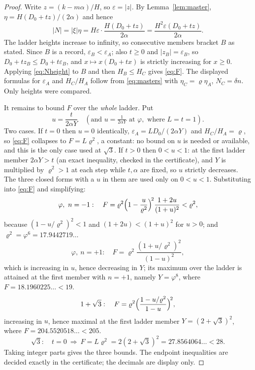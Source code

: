 \documentclass[11pt]{article}
\theoremstyle{definition}
\theoremstyle{remark}
\newcommand{\pr}{\varrho}
\begin{document}
\begin{proof}
Write $z=(k-m\alpha)/H$, so $\varepsilon=|z|$. By Lemma~\ref{lem:master},
$\eta=H(D_0+tz)/(2\alpha)$ and hence
\begin{equation}\label{eq:Nheight}
|N|=|\xi|\eta=H\varepsilon\cdot\frac{H(D_0+tz)}{2\alpha}=\frac{H^2\varepsilon(D_0+tz)}{2\alpha}.
\end{equation}
The ladder heights increase to infinity, so consecutive members bracket $B$ as stated. Since
$B$ is a record, $\varepsilon_B<\varepsilon_A$; also $t\ge0$ and $|z_B|=\varepsilon_B$, so
$D_0+tz_B\le D_0+t\varepsilon_B$, and $x\mapsto x(D_0+tx)$ is strictly increasing for $x\ge0$.
Applying \eqref{eq:Nheight} to $B$ and then $H_B\le H_C$ gives \eqref{eq:F}. The displayed
formulas for $\varepsilon_A$ and $H_C/H_A$ follow from \eqref{eq:masters} with $\eta_C=\pr\eta_A$,
$N_C=\delta n$. Only heights were compared.

It remains to bound $F$ over the \emph{whole} ladder. Put
\[
u=\frac{t}{2\alpha Y}\quad(\text{and }u=\tfrac1{2\alpha Y}\text{ at }\varphi,\text{ where }L=t=1).
\]
Two cases. If $t=0$ then $u=0$ identically, $\varepsilon_A=LD_0/(2\alpha Y)$ and
$H_C/H_A=\pr$, so \eqref{eq:F} collapses to $F=L\pr^2$, a constant: no bound on $u$ is needed
or available, and this is the only case used at $\sqrt3$. If $t>0$ then $0<u<1$: at the first
ladder member $2\alpha Y>t$ (an exact inequality, checked in the certificate), and $Y$ is
multiplied by $\pr^2>1$ at each step while $t,\alpha$ are fixed, so $u$ strictly decreases.
The three closed forms with a $u$ in them are used only on $0<u<1$.
Substituting into \eqref{eq:F} and simplifying:
\[
\varphi,\ n=-1:\quad F=\pr^2\Bigl(1-\frac{u}{\pr^2}\Bigr)^{\!2}\frac{1+2u}{(1+u)^2}<\pr^2,
\]
because $(1-u/\pr^2)^2<1$ and $(1+2u)<(1+u)^2$ for $u>0$; and $\pr^2=\varphi^6=17.9442719\ldots$
\[
\varphi,\ n=+1:\quad F=\pr^2\frac{(1+u/\pr^2)^2}{(1-u)^2},
\]
which is increasing in $u$, hence decreasing in $Y$; its maximum over the ladder is attained at
the first member with $n=+1$, namely $Y=\varphi^8$, where $F=18.1960225\ldots<19$.
\[
1+\sqrt3:\quad F=\pr^2\Bigl(\frac{1-u/\pr^2}{1-u}\Bigr)^{\!2},
\]
increasing in $u$, hence maximal at the first ladder member $Y=(2+\sqrt3)^2$, where
$F=204.5520518\ldots<205$.
\[
\sqrt3:\quad t=0\ \Longrightarrow\ F=L\pr^2=2(2+\sqrt3)^2=27.8564064\ldots<28 .
\]
Taking integer parts gives the three bounds. The endpoint inequalities are decided exactly in
the certificate; the decimals are display only.
\end{proof}
\end{document}
